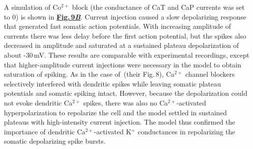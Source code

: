 \documentclass[12pt]{article}
\begin{document}
A simulation of Co$^{2+}$ block (the conductance of CaT and
CaP currents was set to 0) is shown in \href{../pub-purkinje-deschutter1-fig-9/pub-purkinje-deschutter1-fig-9.tex}{\bf Fig.\,9{\it B}}. Current
injection caused a slow depolarizing response that generated
fast somatic action potentials. With increasing amplitude
of currents there was less delay before the first action
potential, but the spikes also decreased in amplitude and
saturated at a sustained plateau depolarization of about
-30\,mV. These results are comparable with experimental
recordings, except that higher-amplitude current injections
were necessary in the model to obtain saturation of spiking.
As in the case of\,\cite{R:1980ly} (their Fig.\,8), Ca$^{2+}$ channel blockers selectively interfered with dendritic
spikes while leaving somatic plateau potentials and
somatic spiking intact. However, because the depolarization
could not evoke dendritic Ca$^{2+}$ spikes, there was also
no Ca$^{2+}$-activated hyperpolarization to repolarize the cell
and the model settled in sustained plateaus with high-intensity
current injection. The model thus confirmed the importance
of dendritic Ca$^{2+}$-activated K$^+$ conductances in
repolarizing the somatic depolarizing spike bursts.



\end{document}
